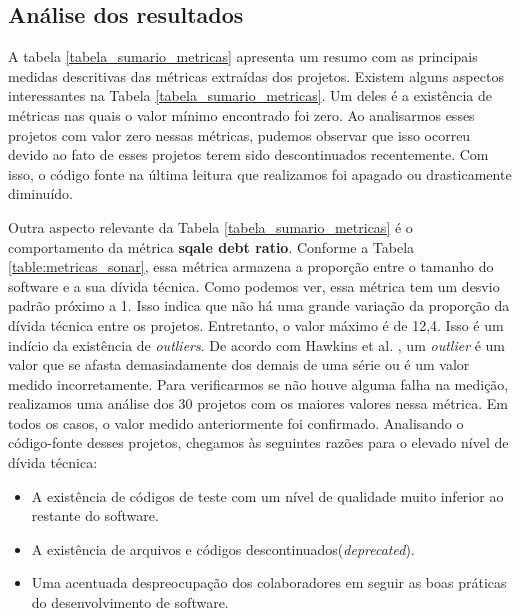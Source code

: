 \subsection{Análise dos resultados}

A tabela \ref{tabela_sumario_metricas} apresenta um resumo com as principais medidas descritivas das métricas extraídas dos projetos. Existem alguns aspectos interessantes na Tabela \ref{tabela_sumario_metricas}. Um deles é a existência de métricas nas quais o valor mínimo encontrado foi zero. Ao analisarmos esses projetos com valor zero nessas métricas, pudemos observar que isso ocorreu devido ao fato de esses projetos terem sido descontinuados recentemente. Com isso, o código fonte na última leitura que realizamos foi apagado ou drasticamente diminuído.  

Outra aspecto relevante da Tabela \ref{tabela_sumario_metricas} é o comportamento da métrica \textbf{sqale debt ratio}. Conforme a Tabela \ref{table:metricas_sonar}, essa métrica armazena a proporção entre o tamanho do software e a sua dívida técnica. Como podemos ver, essa métrica tem um desvio padrão próximo a 1. Isso indica que não há uma grande variação da proporção da dívida técnica entre os projetos.  Entretanto, o valor máximo é de 12,4. Isso é um indício da existência de \textit{outliers}. De acordo com Hawkins et al. \cite{hawkins1980identification}, um \textit{outlier} é um valor que se afasta demasiadamente dos demais de uma série ou é um valor medido incorretamente. Para verificarmos se não houve alguma falha na medição, realizamos uma análise dos 30 projetos com os maiores valores nessa métrica. Em todos os casos, o valor medido anteriormente foi confirmado. Analisando o código-fonte desses projetos, chegamos às seguintes razões para o elevado nível de dívida técnica:

\begin{itemize}
\item A existência de códigos de teste com um nível de qualidade muito inferior ao restante do software.
\item A existência de arquivos e códigos descontinuados(\textit{deprecated}).
\item  Uma acentuada despreocupação dos colaboradores em seguir as boas práticas do desenvolvimento de software.
\end{itemize}


